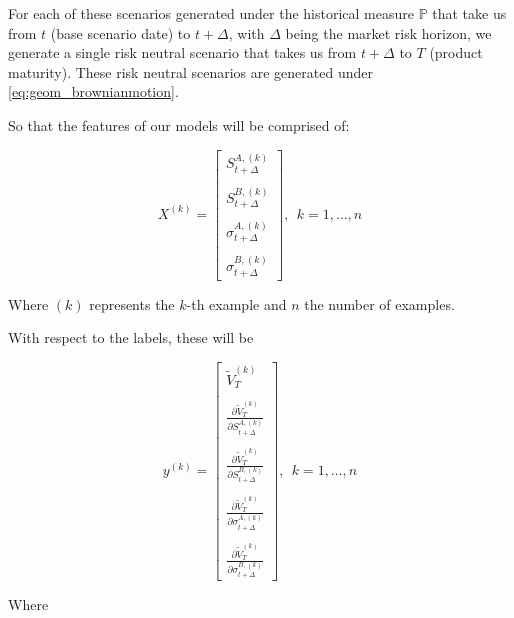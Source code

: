 For each of these scenarios generated under the historical measure $\mathbb{P}$ that take us from $t$ (base scenario date) to $t+\Delta$, with $\Delta$ being the market risk horizon, we generate a single risk neutral scenario that takes us from $t+\Delta$ to $T$ (product maturity). These risk neutral scenarios are generated under \ref{eq:geom_brownianmotion}. 
 \jorge{$\checkmark$}

So that the features of our models will be comprised of:

$$
X^{(k)}=\left[\begin{array}{c}
S_{t+\Delta}^{A,(k)} \\ \\
S_{t+\Delta}^{B,(k)} \\ \\
\sigma_{t+\Delta}^{A,(k)} \\ \\
\sigma_{t+\Delta}^{B,(k)}
\end{array}\right], \ \  k=1, \ldots, n
$$

Where $(k)$ represents the $k$-th example and $n$ the number of examples.

With respect to the labels, these will be 

$$
y^{(k)}=\left[\begin{array}{l}
\tilde{V}_{T}^{(k)} \\ \\
\frac{\partial \tilde{V}_{T}^{(k)}}{\partial S_{t+\Delta}^{A,(k)}} \\ \\
\frac{\partial \tilde{V}_{T}^{(k)}}{\partial S_{t+\Delta}^{B,(k)}} \\ \\
\frac{\partial \tilde{V}_{T}^{(k)}}{\partial \sigma_{t+\Delta}^{A,(k)}} \\ \\
\frac{\partial \tilde{V}_{T}^{(k)}}{\partial \sigma_{t+\Delta}^{B,(k)}}
\end{array}\right],\ \ k=1, \ldots, n
$$

Where

